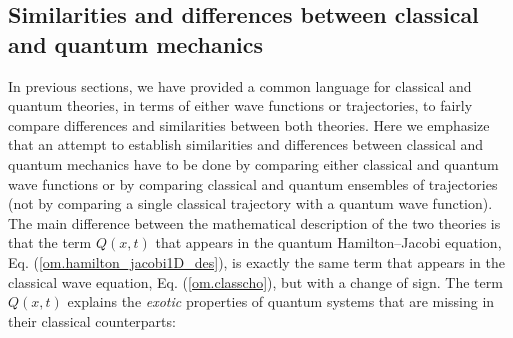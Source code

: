\documentclass[nofootinbib, secnumarabic, amsmath, nobibnotes,11pt,aps,pra, floatfix]{revtex4-1}
\newcommand{\eref}[1]{Eq. (\ref{#1})}
\begin{document}
\subsection{Similarities and differences between classical and quantum mechanics}\label{om.sec_single.4}

In previous sections, we have provided a common language for
classical and quantum theories, in terms of either wave functions or
trajectories, to fairly compare differences and similarities between
both theories. Here we emphasize that an attempt to establish similarities and differences between classical and quantum mechanics have to be done by comparing either
classical and quantum wave functions or by comparing classical and quantum
ensembles of trajectories (not by comparing a single classical trajectory with a
quantum wave function). The main difference between the mathematical
description of the two theories is that the term \textit{$Q(x,t)$}
that appears in the quantum Hamilton--Jacobi equation,
\eref{om.hamilton_jacobi1D_des}, is exactly the same term that
appears in the classical wave equation, \eref{om.classcho}, but with a
change of sign. The term \textit{$Q(x,t)$} explains the
\textit{exotic} properties of quantum systems that are missing in
their classical counterparts:
\end{document}
